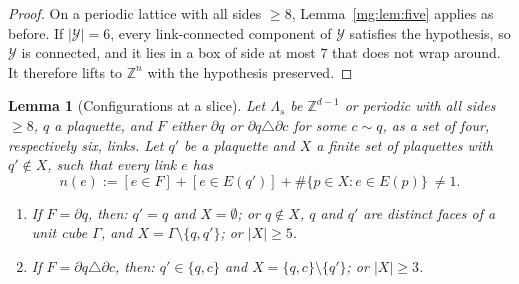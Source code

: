 \documentclass[11pt,a4paper]{article}
\newtheorem{lemma}[theorem]{Lemma}
\theoremstyle{definition}
\theoremstyle{remark}
\newcommand{\Z}{\mathbb{Z}}
\begin{document}
\begin{proof}
On a periodic lattice with all sides $\ge8$, Lemma~\ref{mg:lem:five} applies as before. If $|\mathcal Y|=6$, every link-connected component of $\mathcal Y$
satisfies the hypothesis, so $\mathcal Y$ is connected, and it lies in a box of side at most $7$ that does not wrap around. It therefore lifts to $\Z^n$ with
the hypothesis preserved.
\end{proof}

\begin{lemma}[Configurations at a slice]\label{mg:lem:slice}
Let $\Lambda_s$ be $\Z^{d-1}$ or periodic with all sides $\ge8$, $q$ a plaquette, and $F$ either $\partial q$ or $\partial q\triangle\partial c$ for some $c\sim q$,
as a set of four, respectively six, links. Let $q'$ be a plaquette and $X$ a finite set of plaquettes with $q'\notin X$, such that every link $e$ has
\[
n(e):=[e\in F]+[e\in E(q')]+\#\{p\in X:e\in E(p)\}\ \neq1 .
\]
\begin{enumerate}[label=(\roman*)]
\item If $F=\partial q$, then: $q'=q$ and $X=\emptyset$; or $q\notin X$, $q$ and $q'$ are distinct faces of a unit cube $\Gamma$, and $X=\Gamma\setminus\{q,q'\}$; or
$|X|\ge5$.
\item If $F=\partial q\triangle\partial c$, then: $q'\in\{q,c\}$ and $X=\{q,c\}\setminus\{q'\}$; or $|X|\ge3$.
\end{enumerate}
\end{lemma}
\end{document}
